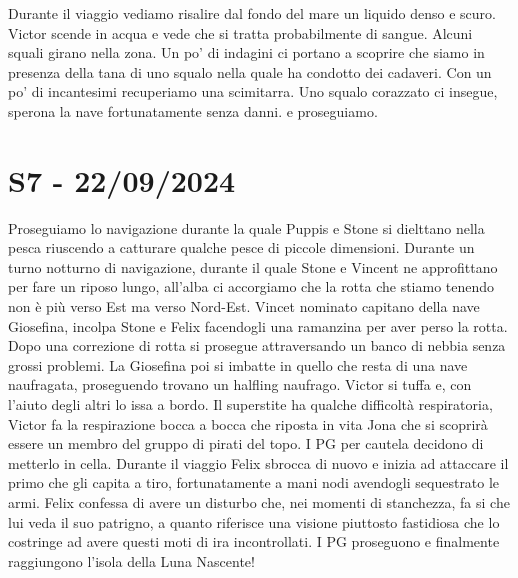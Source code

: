 \documentclass[letterpaper,twocolumn,openany, nodeprecatedcode, nomultitoc]{dndbook}
\begin{document}
Durante il viaggio vediamo risalire dal fondo del mare un liquido denso e scuro. Victor scende in acqua e vede che si tratta probabilmente di sangue. Alcuni squali girano nella zona. Un po' di indagini ci portano a scoprire che siamo in presenza della tana di uno squalo nella quale ha condotto dei cadaveri. Con un po' di incantesimi recuperiamo una scimitarra. Uno squalo corazzato ci insegue, sperona la nave fortunatamente senza danni. e proseguiamo.

\section{S7 - 22/09/2024}
Proseguiamo lo navigazione durante la quale Puppis e Stone si dielttano nella pesca riuscendo a catturare qualche pesce di piccole dimensioni. Durante un turno notturno di navigazione, durante il quale Stone e Vincent ne approfittano per fare un riposo lungo, all'alba ci accorgiamo che la rotta che stiamo tenendo non è più verso Est ma verso Nord-Est. Vincet nominato capitano della nave Giosefina, incolpa Stone e Felix facendogli una ramanzina per aver perso la rotta. Dopo una correzione di rotta si prosegue attraversando un banco di nebbia senza grossi problemi. La Giosefina poi si imbatte in quello che resta di una nave naufragata, proseguendo trovano un halfling naufrago. Victor si tuffa e, con l'aiuto degli altri lo issa a bordo. Il superstite ha qualche difficoltà respiratoria, Victor fa la respirazione bocca a bocca che riposta in vita Jona che si scoprirà essere un membro del gruppo di pirati del topo. I PG per cautela decidono di metterlo in cella.
Durante il viaggio Felix sbrocca di nuovo e inizia ad attaccare il primo che gli capita a tiro, fortunatamente a mani nodi avendogli sequestrato le armi. Felix confessa di avere un disturbo che, nei momenti di stanchezza, fa si che lui veda il suo patrigno, a quanto riferisce una visione piuttosto fastidiosa che lo costringe ad avere questi moti di ira incontrollati.
I PG proseguono e finalmente raggiungono l'isola della Luna Nascente! 
\end{document}

